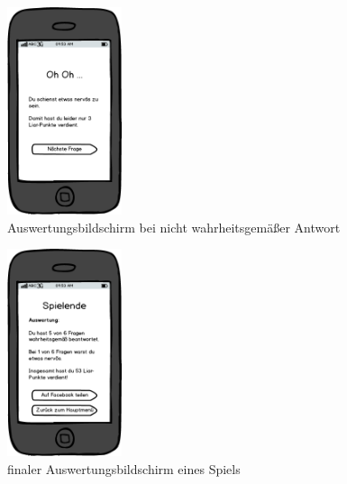 \documentclass[10pt, a4paper, oneside, titlepage]{scrartcl} %
\begin{document}
	\newpage
	\begin{figure}[ht!]
		\begin{center}
			\includegraphics[width=0.3\textwidth]{mockup_05_score2.png}
		\end{center}
		\caption[Mockup Bildschirm Fragenauswertung Lüge]{Auswertungsbildschirm bei nicht wahrheitsgemäßer Antwort}
		\label{fig:mockup_05}
	\end{figure}	
	\begin{figure}[h!]
		\begin{center}
			\includegraphics[width=0.3\textwidth]{mockup_06_finalscore.png}
		\end{center}
		\caption[Mockup finaler Bildschirm zur Fragenauswertung]{finaler Auswertungsbildschirm eines Spiels}
		\label{fig:mockup_06}
	\end{figure}	
\end{document}
